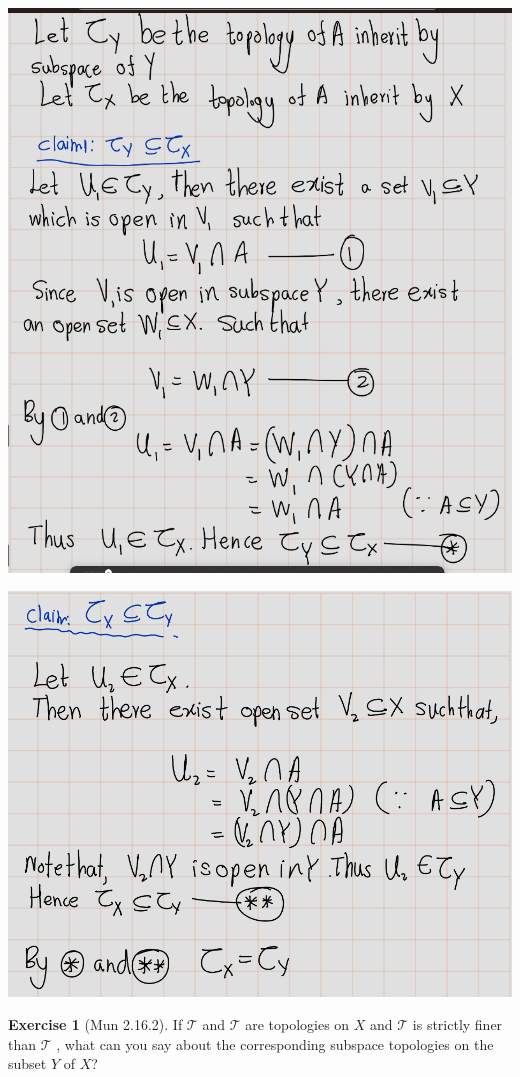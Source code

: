 \documentclass[
]{book}
\theoremstyle{definition}
\theoremstyle{definition}
\theoremstyle{definition}
\newtheorem{exercise}{Exercise}[chapter]
\theoremstyle{definition}
\theoremstyle{remark}
\begin{document}
\includegraphics{figures/Exercises/Ex 2.16/ex1-1.png}

\includegraphics{figures/Exercises/Ex 2.16/ex1-2.png}

\begin{exercise}[Mun 2.16.2]
\protect\hypertarget{exr:unnamed-chunk-116}{}\label{exr:unnamed-chunk-116}If \(\mathcal{T}\) and \(\mathcal{T}\) are topologies on \(X\) and \(\mathcal{T}\) is strictly finer than \(\mathcal{T}\) , what can you
say about the corresponding subspace topologies on the subset \(Y\) of \(X\)?
\end{exercise}
\end{document}
